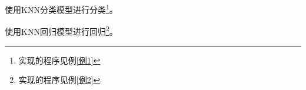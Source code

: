 \begin{Example}
	使用KNN分类模型进行分类\footnote{实现的程序见例\ref{例1}}。
\end{Example}

\begin{Example}
	使用KNN回归模型进行回归\footnote{实现的程序见例\ref{例2}}。
\end{Example}
